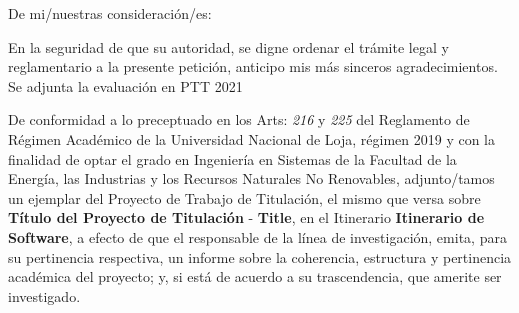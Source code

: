 \documentclass[12pt,a4paper,sans]{moderncv}
\newcommand{\titulo}{Título del Proyecto de Titulación}
\newcommand{\tituloEng}{Title}
\newcommand{\lineaInv}{Itinerario de Software}
\begin{document}
\date{Loja, 23 de marzo del 2021}
\opening{De mi/nuestras consideración/es:}
\closing{En la seguridad de que su autoridad, se digne ordenar el trámite legal y reglamentario a la presente petición, anticipo mis más sinceros agradecimientos. Se adjunta la evaluación en PTT 2021}
\makelettertitle

De conformidad a lo preceptuado en los Arts: \textit{216} y \textit{225} del Reglamento de Régimen Académico de la Universidad Nacional de Loja, régimen 2019 y con la finalidad de optar el grado en Ingeniería en Sistemas de la Facultad de la Energía, las Industrias y los Recursos Naturales No Renovables, adjunto/tamos un ejemplar del Proyecto de Trabajo de Titulación, el mismo que versa sobre \textbf{\titulo} - \textbf{\tituloEng}, en el Itinerario \textbf{\lineaInv}, a efecto de que el responsable de la línea de investigación, emita, para su pertinencia respectiva, un informe sobre la coherencia, estructura y pertinencia académica del proyecto; y, si está de acuerdo a su trascendencia, que amerite ser investigado.

\makeletterclosing
\end{document}
